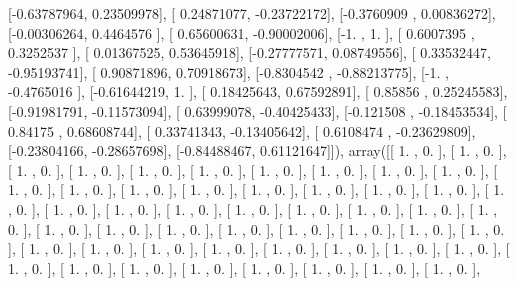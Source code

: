 \documentclass{article}
\begin{document}
       [-0.63787964,  0.23509978],
       [ 0.24871077, -0.23722172],
       [-0.3760909 ,  0.00836272],
       [-0.00306264,  0.4464576 ],
       [ 0.65600631, -0.90002006],
       [-1.        ,  1.        ],
       [ 0.6007395 ,  0.3252537 ],
       [ 0.01367525,  0.53645918],
       [-0.27777571,  0.08749556],
       [ 0.33532447, -0.95193741],
       [ 0.90871896,  0.70918673],
       [-0.8304542 , -0.88213775],
       [-1.        , -0.4765016 ],
       [-0.61644219,  1.        ],
       [ 0.18425643,  0.67592891],
       [ 0.85856   ,  0.25245583],
       [-0.91981791, -0.11573094],
       [ 0.63999078, -0.40425433],
       [-0.121508  , -0.18453534],
       [ 0.84175   ,  0.68608744],
       [ 0.33741343, -0.13405642],
       [ 0.6108474 , -0.23629809],
       [-0.23804166, -0.28657698],
       [-0.84488467,  0.61121647]]), array([[ 1.        ,  0.        ],
       [ 1.        ,  0.        ],
       [ 1.        ,  0.        ],
       [ 1.        ,  0.        ],
       [ 1.        ,  0.        ],
       [ 1.        ,  0.        ],
       [ 1.        ,  0.        ],
       [ 1.        ,  0.        ],
       [ 1.        ,  0.        ],
       [ 1.        ,  0.        ],
       [ 1.        ,  0.        ],
       [ 1.        ,  0.        ],
       [ 1.        ,  0.        ],
       [ 1.        ,  0.        ],
       [ 1.        ,  0.        ],
       [ 1.        ,  0.        ],
       [ 1.        ,  0.        ],
       [ 1.        ,  0.        ],
       [ 1.        ,  0.        ],
       [ 1.        ,  0.        ],
       [ 1.        ,  0.        ],
       [ 1.        ,  0.        ],
       [ 1.        ,  0.        ],
       [ 1.        ,  0.        ],
       [ 1.        ,  0.        ],
       [ 1.        ,  0.        ],
       [ 1.        ,  0.        ],
       [ 1.        ,  0.        ],
       [ 1.        ,  0.        ],
       [ 1.        ,  0.        ],
       [ 1.        ,  0.        ],
       [ 1.        ,  0.        ],
       [ 1.        ,  0.        ],
       [ 1.        ,  0.        ],
       [ 1.        ,  0.        ],
       [ 1.        ,  0.        ],
       [ 1.        ,  0.        ],
       [ 1.        ,  0.        ],
       [ 1.        ,  0.        ],
       [ 1.        ,  0.        ],
       [ 1.        ,  0.        ],
       [ 1.        ,  0.        ],
       [ 1.        ,  0.        ],
       [ 1.        ,  0.        ],
       [ 1.        ,  0.        ],
       [ 1.        ,  0.        ],
       [ 1.        ,  0.        ],
       [ 1.        ,  0.        ],
       [ 1.        ,  0.        ],
       [ 1.        ,  0.        ],
       [ 1.        ,  0.        ],
\end{document}
